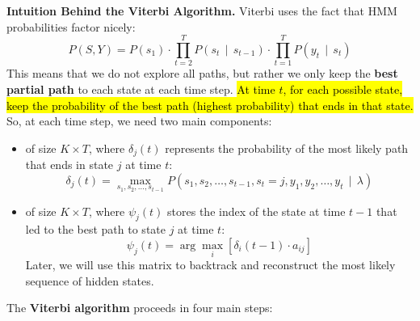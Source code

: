\highspace
\textcolor{Green3}{ \textbf{Intuition Behind the Viterbi Algorithm.}} Viterbi uses the fact that HMM probabilities factor nicely:
\begin{equation*}
    P\left(S, Y\right) = P\left(s_1\right) \cdot \prod_{t=2}^{T} P\left(s_t \, \mid \, s_{t-1}\right) \cdot \prod_{t=1}^{T} P\left(y_t \, \mid \, s_t\right)
\end{equation*}
This means that we do not explore all paths, but rather we only keep the \textbf{best partial path} to each state at each time step. \hl{At time $t$, for each possible state, keep the probability of the best path (highest probability) that ends in that state.} So, at each time step, we need two main components:
\begin{itemize}
    \item {} of size $K \times T$, where $\delta_j(t)$ represents the probability of the most likely path that ends in state $j$ at time $t$:
    \begin{equation}
        \delta_j(t) = \max_{s_1, s_2, \ldots, s_{t-1}} P\left(s_1, s_2, \ldots, s_{t-1}, s_t = j, y_1, y_2, \ldots, y_t \, \mid \, \lambda\right)
    \end{equation}

    \item {} of size $K \times T$, where $\psi_j(t)$ stores the index of the state at time $t-1$ that led to the best path to state $j$ at time $t$:
    \begin{equation}
        \psi_j(t) = \arg\max_{i} \left[\delta_i(t-1) \cdot a_{ij}\right]
    \end{equation}
    Later, we will use this matrix to backtrack and reconstruct the most likely sequence of hidden states.
\end{itemize}
\textcolor{Green3}{} The \textbf{Viterbi algorithm} proceeds in four main steps:
